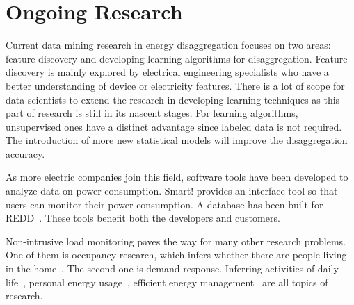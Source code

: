 \section{Ongoing Research}
\label{sec:ongoing}
Current data mining research in energy disaggregation focuses on two areas: 
feature discovery and developing learning algorithms for disaggregation.
Feature discovery is mainly explored by electrical engineering specialists 
who have a better understanding of device or electricity features.
There is a lot of scope for data scientists to extend the research in developing
learning techniques as this part of research is still in its nascent stages. 
For learning algorithms, unsupervised ones have a distinct advantage since
labeled data is not required. 
The introduction of more new statistical models 
will improve the disaggregation accuracy.

As more electric companies join this field, 
software tools have been developed to analyze data on power consumption. 
Smart!\cite{barker2012smart} provides an interface tool 
so that users can monitor their power consumption. 
A database has been built for REDD~\cite{lai2012database}.
These tools benefit both the developers and customers. 

Non-intrusive load monitoring paves the way for many other research problems. 
One of them is occupancy research, which infers whether there are people living in the home~\cite{chen2013non}.
The second one is demand response. Inferring activities of daily life~\cite{song2014short}, 
personal energy usage~\cite{lee2014personalized}, efficient energy management~\cite{collins2012smart} are all topics of research.




